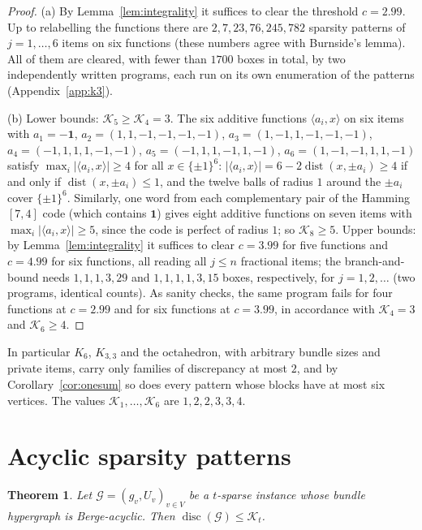 \documentclass[11pt,letterpaper]{article}
\newtheorem{theorem}{Theorem}[section]
\theoremstyle{definition}
\newcommand{\cG}{\mathcal{G}}
\newcommand{\cube}[1]{\{\pm1\}^{#1}}
\DeclareMathOperator{\disc}{disc}
\DeclareMathOperator{\dist}{dist}
\begin{document}
\begin{proof}
(a) By Lemma~\ref{lem:integrality} it suffices to clear the threshold $c=2.99$. Up to relabelling the
functions there are $2,7,23,76,245,782$ sparsity patterns of $j=1,\dots,6$ items on six functions
(these numbers agree with Burnside's lemma). All of them are cleared, with fewer than $1700$ boxes in
total, by two independently written programs, each run on its own enumeration of the patterns
(Appendix~\ref{app:k3}).

(b) Lower bounds: $\mathcal{K}_5\ge\mathcal{K}_4=3$. The six additive functions
$\langle a_i,x\rangle$ on six items with $a_1=-\mathbf 1$, $a_2=(1,1,-1,-1,-1,-1)$,
$a_3=(1,-1,1,-1,-1,-1)$, $a_4=(-1,1,1,1,-1,-1)$, $a_5=(-1,1,1,-1,1,-1)$, $a_6=(1,-1,-1,1,1,-1)$ satisfy
$\max_i|\langle a_i,x\rangle|\ge4$ for all $x\in\cube6$: $|\langle a_i,x\rangle|=6-2\dist(x,\pm a_i)\ge4$
if and only if $\dist(x,\pm a_i)\le1$, and the twelve balls of radius $1$ around the $\pm a_i$ cover
$\cube6$. Similarly, one word from each complementary pair of the Hamming $[7,4]$ code (which contains
$\mathbf 1$) gives eight additive functions on seven items with $\max_i|\langle a_i,x\rangle|\ge5$, since
the code is perfect of radius $1$; so $\mathcal{K}_8\ge5$. Upper bounds: by Lemma~\ref{lem:integrality}
it suffices to clear $c=3.99$ for five functions and $c=4.99$ for six functions, all reading all $j\le n$
fractional items; the branch-and-bound needs $1,1,1,3,29$ and $1,1,1,1,3,15$ boxes, respectively, for
$j=1,2,\dots$ (two programs, identical counts). As sanity checks, the same program fails for four
functions at $c=2.99$ and for six functions at $c=3.99$, in accordance with $\mathcal{K}_4=3$ and
$\mathcal{K}_6\ge4$.
\end{proof}

In particular $K_6$, $K_{3,3}$ and the octahedron, with arbitrary bundle sizes and private items, carry
only families of discrepancy at most $2$, and by Corollary~\ref{cor:onesum} so does every pattern whose
blocks have at most six vertices. The values $\mathcal{K}_1,\dots,\mathcal{K}_6$ are $1,2,2,3,3,4$.

\section{Acyclic sparsity patterns}\label{sec:acyclic}

\begin{theorem}\label{thm:Ainst}
Let $\cG=(g_v,U_v)_{v\in V}$ be a $t$-sparse instance whose bundle hypergraph is Berge-acyclic.
Then $\disc(\cG)\le \mathcal{K}_t$.
\end{theorem}
\end{document}
